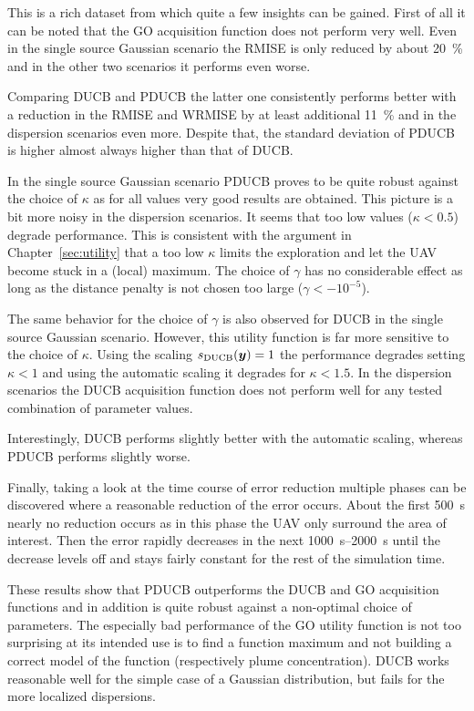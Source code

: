 This is a rich dataset from which quite a few insights can be gained. First of 
all it can be noted that the GO acquisition function does not perform very well.  
Even in the single source Gaussian scenario the RMISE is only reduced by about 
\SI{20}{\percent} and in the other two scenarios it performs even worse.

Comparing DUCB and PDUCB the latter one consistently performs better with 
a reduction in the RMISE and WRMISE by at least additional \SI{11}{\percent} and 
in the dispersion scenarios even more.  Despite that, the standard deviation of 
PDUCB is higher almost always higher than that of DUCB\@.

In the single source Gaussian scenario PDUCB proves to be quite robust against 
the choice of $\kappa$ as for all values very good results are obtained. This 
picture is a bit more noisy in the dispersion scenarios. It seems that too low 
values ($\kappa < 0.5$) degrade performance. This is consistent with the 
argument in Chapter~\ref{sec:utility} that a too low $\kappa$ limits the 
exploration and let the UAV become stuck in a (local) maximum. The choice of 
$\gamma$ has no considerable effect as long as the distance penalty is not 
chosen too large ($\gamma < -10^{-5}$).

The same behavior for the choice of $\gamma$ is also observed for DUCB in the 
single source Gaussian scenario. However, this utility function is far more 
sensitive to the choice of $\kappa$. Using the scaling $s_{\mathrm{DUCB}}(\bm{y}) = 1$ 
the performance degrades setting $\kappa < 1$ and using the automatic scaling it 
degrades for $\kappa < 1.5$. In the dispersion scenarios the DUCB acquisition 
function does not perform well for any tested combination of parameter values.

Interestingly,  DUCB performs slightly better with the automatic scaling, 
whereas PDUCB performs slightly worse.

Finally, taking a look at the time course of error reduction multiple phases can 
be discovered where a reasonable reduction of the error occurs. About the first 
\SI{500}{\second} nearly no reduction occurs as in this phase the UAV only 
surround the area of interest. Then the error rapidly decreases in the next 
\SIrange{1000}{2000}{\second} until the decrease levels off and stays fairly 
constant for the rest of the simulation time.

These results show that PDUCB outperforms the DUCB and GO acquisition functions 
and in addition is quite robust against a non-optimal choice of parameters. The 
especially bad performance of the GO utility function is not too surprising at 
its intended use is to find a function maximum and not building a correct model 
of the function (respectively plume concentration).  DUCB works reasonable well 
for the simple case of a Gaussian distribution, but fails for the more localized 
dispersions.

